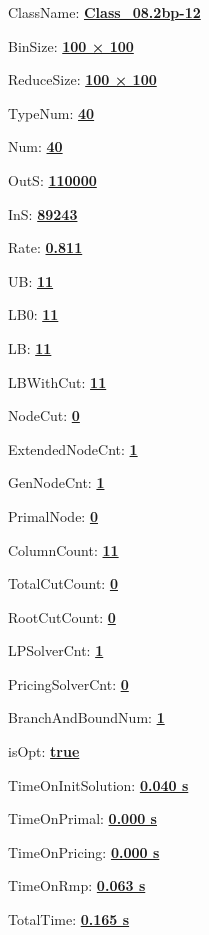 \documentclass[11pt]{article}
\begin{document}
\pagestyle{empty}


ClassName: \underline{\textbf{Class_08.2bp-12}}
\par
BinSize: \underline{\textbf{100 × 100}}
\par
ReduceSize: \underline{\textbf{100 × 100}}
\par
TypeNum: \underline{\textbf{40}}
\par
Num: \underline{\textbf{40}}
\par
OutS: \underline{\textbf{110000}}
\par
InS: \underline{\textbf{89243}}
\par
Rate: \underline{\textbf{0.811}}
\par
UB: \underline{\textbf{11}}
\par
LB0: \underline{\textbf{11}}
\par
LB: \underline{\textbf{11}}
\par
LBWithCut: \underline{\textbf{11}}
\par
NodeCut: \underline{\textbf{0}}
\par
ExtendedNodeCnt: \underline{\textbf{1}}
\par
GenNodeCnt: \underline{\textbf{1}}
\par
PrimalNode: \underline{\textbf{0}}
\par
ColumnCount: \underline{\textbf{11}}
\par
TotalCutCount: \underline{\textbf{0}}
\par
RootCutCount: \underline{\textbf{0}}
\par
LPSolverCnt: \underline{\textbf{1}}
\par
PricingSolverCnt: \underline{\textbf{0}}
\par
BranchAndBoundNum: \underline{\textbf{1}}
\par
isOpt: \underline{\textbf{true}}
\par
TimeOnInitSolution: \underline{\textbf{0.040 s}}
\par
TimeOnPrimal: \underline{\textbf{0.000 s}}
\par
TimeOnPricing: \underline{\textbf{0.000 s}}
\par
TimeOnRmp: \underline{\textbf{0.063 s}}
\par
TotalTime: \underline{\textbf{0.165 s}}
\par
\newpage


\end{document}
